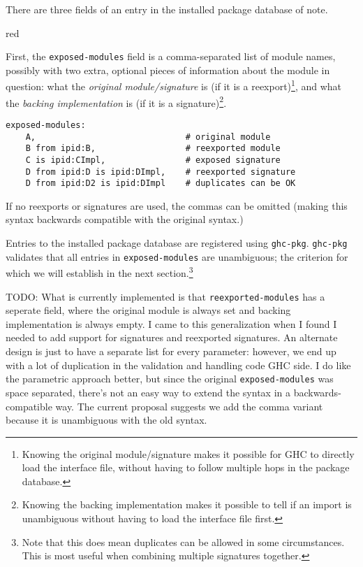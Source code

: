 \documentclass{article}
\begin{document}
There are three fields of an entry in the installed package database of note.

\begin{color}{red}

First, the \texttt{exposed-modules} field is a comma-separated list of
module names, possibly with two extra, optional pieces of information
about the module in question: what the \emph{original module/signature}
is (if it is a reexport)\footnote{Knowing the original module/signature
makes it possible for GHC to directly load the interface file, without
having to follow multiple hops in the package database.}, and what the
\emph{backing implementation} is (if it is a signature)\footnote{Knowing
the backing implementation makes it possible to tell if an import is
unambiguous without having to load the interface file first.}.

\begin{verbatim}
exposed-modules:
    A,                              # original module
    B from ipid:B,                  # reexported module
    C is ipid:CImpl,                # exposed signature
    D from ipid:D is ipid:DImpl,    # reexported signature
    D from ipid:D2 is ipid:DImpl    # duplicates can be OK
\end{verbatim}

If no reexports or signatures are used, the commas can be omitted
(making this syntax backwards compatible with the original syntax.)

Entries to the installed package database are registered using \texttt{ghc-pkg}.
\texttt{ghc-pkg} validates that all entries in \texttt{exposed-modules} are
unambiguous; the criterion for which we will establish in the next section.\footnote{Note
that this does mean duplicates can be allowed in some circumstances.  This is most useful
when combining multiple signatures together.}

TODO: What is currently implemented is
that \texttt{reexported-modules} has a seperate field, where the
original module is always set and backing implementation is always empty.
I came to this generalization when I found I needed to add support for
signatures and reexported signatures.  An alternate design is just to
have a separate list for every parameter: however, we end up with a lot
of duplication in the validation and handling code GHC side.  I do like
the parametric approach better, but since the original
\texttt{exposed-modules} was space separated, there's not an easy way to
extend the syntax in a backwards-compatible way.  The current proposal
suggests we add the comma variant because it is unambiguous with the old
syntax.
\end{color}
\end{document}
